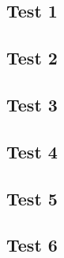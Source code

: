 \documentclass[10pt]{article}
\begin{document}
\subsection{Test 1}



\subsection{Test 2}



\subsection{Test 3}



\subsection{Test 4}



\subsection{Test 5}



\subsection{Test 6}


\end{document}
